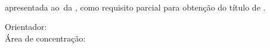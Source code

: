 
\setcounter{page}{1}
	\thispagestyle{empty}
  
	\begin{center}
		\por%
	\end{center}
	
	\vfill %
	
	\begin{center}
		\textbf{\monog}\\ %
		\textbf{\subtitulo} %
	\end{center}
	
	\vfill %
	
	\begin{flushright}
		\begin{minipage}{9cm} %
			 {\tipo \hspace{0.1cm} apresentada ao\curso~da \univ, como requisito parcial para obtenção do título de \grau.} \par %
			\vspace{1cm}
			Orientador: {\profOrientador} \\ %
			
			\bigskip
			Área de concentração: {\areaConcentracao}

		\end{minipage}
	\end{flushright}
	
	\vfill %
	
	\begin{center}
		\cidade\\ %
		\ano %
	\end{center}
	
	\newpage %


%
%
%  
